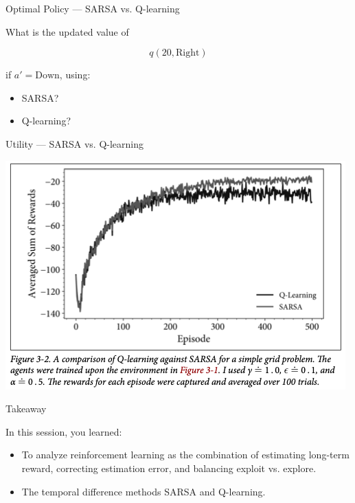 \documentclass[11pt]{beamer}
\begin{document}
\begin{frame}{Optimal Policy --- SARSA vs. Q-learning}
\begin{minipage}{.4\linewidth}
\vspace{.5\baselineskip}

\begin{small}
What is the updated value of 

\vspace{-1.5\baselineskip}

\[
q(20, \text{Right})
\]

\vspace{.25\baselineskip}

if $a' = \text{Down}$, using:

\vspace{.25\baselineskip}

\begin{itemize}
\item SARSA?
\item Q-learning?
\end{itemize}
\end{small}

\end{minipage}

\end{frame}

\begin{frame}{Utility --- SARSA vs. Q-learning}

\begin{center}
\includegraphics[width=.65\linewidth]{images/utilities_sarsa_vs_q_learning}
\end{center}

\end{frame}




\begin{frame}{Takeaway}

In this session, you learned:

\begin{itemize}
\item To analyze reinforcement learning as the combination of estimating long-term reward, correcting estimation error, and balancing exploit vs. explore.
\item The temporal difference methods SARSA and Q-learning.
\end{itemize}

\end{frame}
\end{document}
